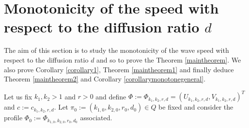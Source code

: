 \documentclass[11pt]{article}
\numberwithin{equation}{section}
\newcommand{\1}{\mathbbm{1}}
\numberwithin{equation}{section}
\theoremstyle{definition}
\def \c{c_{k_1,k_2,r,d}}
\numberwithin{equation}{section}
\begin{document}
\section{Monotonicity of the speed with respect to the diffusion ratio $d$}\label{monotonicity}
The aim of this section is to study the monotonicity of the wave speed with respect to the diffusion ratio $d$ and so to prove the Theorem \ref{maintheorem}. We also prove Corollary \ref{corollary1}, Theorem \ref{maintheorem1} and finally deduce Theorem \ref{maintheorem2} and Corollary \ref{corollarymonotonegeneral}.

Let us fix $k_1,k_2>1$ and $r>0$ and define $\Phi:=\Phi_{k_1,k_2,r,d}=(U_{k_1,k_2,r,d},V_{k_1,k_2,r,d})^T$ and  $c:=\c$. Let $\pi_0:=(k_{1,0},k_{2,0}, r_0,d_0)\in Q$ be fixed and consider the profile $\Phi_0:=\Phi_{k_{1,0},k_{2,0},r_0,d_0}$ associated. 
\end{document}
